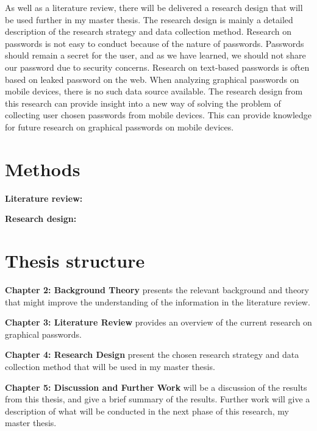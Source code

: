     As well as a literature review, there will be delivered a research design that will be used further in my master thesis. The research design is mainly a detailed description of the research strategy and data collection method. Research on passwords is not easy to conduct because of the nature of passwords. Passwords should remain a secret for the user, and as we have learned, we should not share our password due to security concerns. Research on text-based passwords is often based on leaked password on the web. When analyzing graphical passwords on mobile devices, there is no such data source available. 
    The research design from this research can provide insight into a new way of solving the problem of collecting user chosen passwords from mobile devices. This can provide knowledge for future research on graphical passwords on mobile devices.

  \section{Methods}

    {\bf Literature review:}

    {\bf Research design:}

  \section{Thesis structure}

    {\bf Chapter 2: Background Theory} presents the relevant background and theory that might improve the understanding of the information in the literature review. 

    {\bf Chapter 3: Literature Review} provides an overview of the current research on graphical passwords. 

    {\bf Chapter 4: Research Design} present the chosen research strategy and data collection method that will be used in my master thesis. 

    {\bf Chapter 5: Discussion and Further Work} will be a discussion of the results from this thesis, and give a brief summary of the results. Further work will give a description of what will be conducted in the next phase of this research, my master thesis.  





